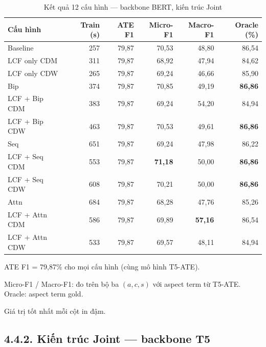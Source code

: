 \begin{table}[H]
\centering
\small
\caption{Kết quả 12 cấu hình — backbone BERT, kiến trúc Joint}
\label{tab:bert_results}
\begin{threeparttable}
\begin{tabular}{@{}lrrrrr@{}}
\toprule
\textbf{Cấu hình} & \textbf{Train (s)} & \textbf{ATE F1} & \textbf{Micro-F1} & \textbf{Macro-F1} & \textbf{Oracle (\%)} \\
\midrule
Baseline               & 257 & 79,87 & 70,53 & 48,80 & 86,54 \\
\midrule
LCF only CDM           & 311 & 79,87 & 68,92 & 47,94 & 84,62 \\
LCF only CDW           & 265 & 79,87 & 69,24 & 46,66 & 85,90 \\
\midrule
Bip                    & 374 & 79,87 & 70,85 & 49,19 & \textbf{86,86} \\
LCF + Bip CDM          & 383 & 79,87 & 69,24 & 54,20 & 84,94 \\
LCF + Bip CDW          & 463 & 79,87 & 70,53 & 49,61 & \textbf{86,86} \\
\midrule
Seq                    & 651 & 79,87 & 69,24 & 47,98 & 86,22 \\
LCF + Seq CDM          & 553 & 79,87 & \textbf{71,18} & 50,00 & \textbf{86,86} \\
LCF + Seq CDW          & 608 & 79,87 & 70,21 & 50,00 & \textbf{86,86} \\
\midrule
Attn                   & 684 & 79,87 & 68,28 & 47,76 & 85,26 \\
LCF + Attn CDM         & 586 & 79,87 & 69,89 & \textbf{57,16} & 86,54 \\
LCF + Attn CDW         & 533 & 79,87 & 69,57 & 48,11 & 84,94 \\
\bottomrule
\end{tabular}
\begin{tablenotes}
  \small
  \item ATE F1 = 79,87\% cho mọi cấu hình (cùng mô hình T5-ATE).
  \item Micro-F1 / Macro-F1: đo trên bộ ba $(a, c, s)$ với aspect term
        từ T5-ATE. Oracle: aspect term gold.
  \item Giá trị tốt nhất mỗi cột in đậm.
\end{tablenotes}
\end{threeparttable}
\end{table}

\subsection{4.4.2.\; Kiến trúc Joint — backbone T5}

